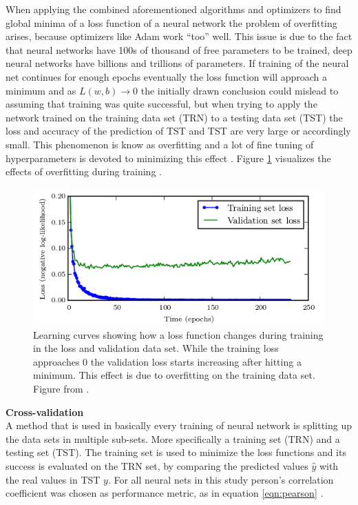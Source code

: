 When applying the combined aforementioned algorithms and optimizers to find global minima of a loss function
of a neural network the problem of overfitting arises, because optimizers like Adam work ``too'' well. This
issue is due to the fact that neural networks have 100s of thousand of free parameters to be trained, deep
neural networks have billions and trillions of parameters. If training of the neural net continues for enough
epochs eventually the loss function will approach a minimum and as $ L(w,b)\rightarrow 0 $ the initially drawn
conclusion could mislead to assuming that training was quite successful, but when trying to apply the network trained on
the training data set (TRN) to a testing data set (TST) the loss and accuracy of the prediction of TST and
TST are very large or accordingly small. This phenomenon is know as overfitting and a lot of fine tuning of
hyperparameters is devoted to minimizing this effect \cite{tetko1995neural}. Figure \ref{fig:overfitting}
visualizes the effects of overfitting during training \cite{goodfellow2016deep}.

\begin{figure}[H]
   \centering \includegraphics[height=.35\textheight, width=1.1\textwidth]{Figures/overfitting} \decoRule
   \caption[Training vs. validation loss over time]{Learning curves showing how a loss function changes during training
     in the loss and validation data set. While the training loss approaches 0 the validation loss starts increasing
     after hitting a minimum. This effect is due to overfitting on the training data set. Figure from
     \cite{goodfellow2016deep}.}
 \label{fig:overfitting}
\end{figure}

\textbf{Cross-validation} \\

A method that is used in basically every training of neural network is splitting up the data sets in multiple
sub-sets.  More specifically a training set (TRN) and a testing set (TST). The training set is used to
minimize the loss functions and its success is evaluated on the TRN set, by comparing the predicted values
$\hat{y}$ with the real values in TST $y$.  For all neural nets in this study person's correlation coefficient
was chosen as performance metric, as in equation \ref{eqn:pearson} \cite{soper1917distribution}.

